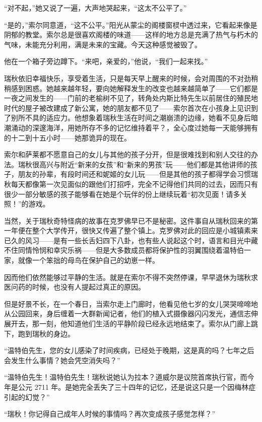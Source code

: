\documentclass[AutoFakeBold=true]{book}
\begin{document}
``对不起，''她又说了一遍，大声地哭起来，``这太不公平了。''

``是的，''索尔同意道，``这不公平。''阳光从蒙尘的阁楼窗棂中透过来，它看起来像是阴郁的教堂。索尔总是很喜欢阁楼的味道——这样的地方总是充满了热气与朽木的气味，未能充分利用，满是未来的宝藏。今天这种感觉被毁了。

他在一个箱子旁边蹲下。``来吧，亲爱的，''他说，``我们一起来找。''

瑞秋依旧幸福快乐，享受着生活，只是每天早上醒来的时候，会对周围的不对劲稍稍感到困惑。她越来越年轻，要向她解释发生的改变也越来越简单了——它们都是一夜之间发生的——门前的老榆树不见了，转角处内斯比特先生以前居住的殖民地时代的屋子被改建成了新公寓，她的朋友都不见了——索尔首次在小孩身上见识到了别所不具的适应力。他想象着瑞秋生活在时间之潮崩溃的边缘，她看不见身后暗潮涌动的深邃海洋，用她所存不多的记忆维持着平？，全心度过她每一天能够拥有的十二到十五小时——她那诡异的现在。

索尔和萨莱都不愿意自己的女儿与其他的孩子分开，但是很难找到和别人交往的办法。瑞秋很高兴与附近``新来的女孩''和``新来的男孩''玩——他们都是其他讲师的孩子，朋友的孙辈，有段时间还和妮姬的女儿玩——但是其他的孩子都得学会习惯瑞秋每天都像第一次见面似的跟他们打招呼，完全不记得他们共同的过去，因而只有很少一部分敏感的孩子能够看在她是个玩伴的份上继续玩着``初次见面！请多关照！''的游戏。

当然，关于瑞秋奇特怪病的故事在克罗佛早已不是秘密。这件事自从瑞秋回来的第一年便在整个大学传开，很快又传遍了整个镇上。克罗佛对此的回应是小城镇素来已久的风习——是有一些长舌妇四下八卦，也有些人说起这个时，语言和目光中藏不住同情怜悯和幸灾乐祸——但是大多数成员都将保护性的羽翼围绕着温特伯一家，就像一个笨拙的母鸟在保护自己的幼崽一样。

因而他们依然能够过平静的生活。就是在索尔不得不突然停课，早早退休为瑞秋求医问药的时候，也没有人提起过真正的原因。

但是好景不长，在一个春日，当索尔走上门廊时，他看见他七岁的女儿哭哭啼啼地从公园回来，身后缠着一大群新闻记者，他们的植入式摄像器闪闪发光，通信志伸展开去，那一刻，他知道他们生活的平静阶段已经永远地结束了。索尔从门廊上跳下，跑到瑞秋的身边。

``温特伯先生，您的女儿感染了时间疾病，已经处于晚期，这是真的吗？七年之后会发生什么事情？她会凭空消失吗？''

``温特伯先生！温特伯先生！瑞秋说她认为拉本？道威尔是议院首席执行官，而今年是公元 2711 年。是她完全丢失了三十四年的记忆，还是说这只是一个因梅林症引起的幻觉？''

``瑞秋！你记得自己成年人时候的事情吗？再次变成孩子感觉怎样？''
\end{document}
